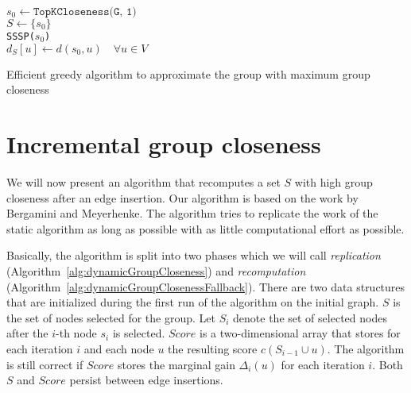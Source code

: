 \begin{algorithm2e}[h!]
  \label{alg:bergaminiGroupCloseness}
 
  $s_0 \gets \texttt{TopKCloseness(G, 1)}$ \label{alg:gcTopKCloseness} \\
  $S \gets \{s_0\}$ \\
  \texttt{SSSP($s_0$)} \\
  $d_S[u] \gets d(s_0, u) \quad \forall u \in V$ \\
  
 
  \caption{Efficient greedy algorithm to approximate the group with maximum group closeness}
\end{algorithm2e}

\newpage

\section{Incremental group closeness}
We will now present an algorithm that recomputes a set $S$ with high group closeness after an edge insertion. Our algorithm is based on the work by Bergamini and Meyerhenke. The algorithm tries to replicate the work of the static algorithm as long as possible with as little computational effort as possible.

Basically, the algorithm is split into two phases which we will call \emph{replication} (Algorithm~\ref{alg:dynamicGroupCloseness}) and \emph{recomputation} (Algorithm~\ref{alg:dynamicGroupClosenessFallback}). There are two data structures that are initialized during the first run of the algorithm on the initial graph. $S$ is the set of nodes selected for the group. Let $S_i$ denote the set of selected nodes after the $i$-th node $s_i$ is selected. $Score$ is a two-dimensional array that stores for each iteration $i$ and each node $u$ the resulting score $c(S_{i - 1} \cup u)$. The algorithm is still correct if $Score$ stores the marginal gain $\Delta_i(u)$ for each iteration $i$. Both $S$ and $Score$ persist between edge insertions.

